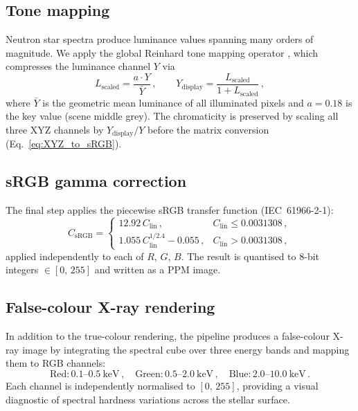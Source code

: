 \subsection{Tone mapping}

Neutron star spectra produce luminance values spanning many orders of
magnitude.  We apply the global Reinhard tone mapping operator
\citep{reinhard_2002}, which compresses the luminance channel $Y$ via
\begin{equation}
  L_{\mathrm{scaled}} = \frac{a \cdot Y}{\bar{Y}}\,,
  \qquad
  Y_{\mathrm{display}} = \frac{L_{\mathrm{scaled}}}{1 + L_{\mathrm{scaled}}}\,,
  \label{eq:reinhard}
\end{equation}
where $\bar{Y}$ is the geometric mean luminance of all illuminated pixels
and $a = 0.18$ is the key value (scene middle grey).  The chromaticity is
preserved by scaling all three XYZ channels by
$Y_{\mathrm{display}} / Y$ before the matrix conversion
(Eq.~\ref{eq:XYZ_to_sRGB}).

\subsection{sRGB gamma correction}

The final step applies the piecewise sRGB transfer function
(IEC~61966-2-1):
\begin{equation}
  C_{\mathrm{sRGB}} =
  \begin{cases}
    12.92\, C_{\mathrm{lin}}\,, & C_{\mathrm{lin}} \leq 0.0031308\,, \\[4pt]
    1.055\, C_{\mathrm{lin}}^{1/2.4} - 0.055\,, & C_{\mathrm{lin}} > 0.0031308\,,
  \end{cases}
  \label{eq:srgb_gamma}
\end{equation}
applied independently to each of $R$, $G$, $B$.  The result is quantised
to 8-bit integers $\in [0,\,255]$ and written as a PPM image.

\subsection{False-colour X-ray rendering}

In addition to the true-colour rendering, the pipeline produces a
false-colour X-ray image by integrating the spectral cube over three
energy bands and mapping them to RGB channels:
\begin{equation}
  \text{Red}: 0.1\text{--}0.5~\mathrm{keV}\,,\quad
  \text{Green}: 0.5\text{--}2.0~\mathrm{keV}\,,\quad
  \text{Blue}: 2.0\text{--}10.0~\mathrm{keV}\,.
  \label{eq:false_colour_bands}
\end{equation}
Each channel is independently normalised to $[0,\,255]$, providing a visual
diagnostic of spectral hardness variations across the stellar surface.